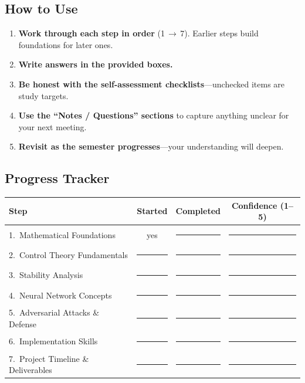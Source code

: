 \subsection*{How to Use}

\begin{enumerate}[leftmargin=2em]
	\item \textbf{Work through each step in order} (1\,$\to$\,7). Earlier steps build foundations for later ones.
	\item \textbf{Write answers in the provided boxes.}
	\item \textbf{Be honest with the self-assessment checklists}---unchecked items are study targets.
	\item \textbf{Use the ``Notes / Questions'' sections} to capture anything unclear for your next meeting.
	\item \textbf{Revisit as the semester progresses}---your understanding will deepen.
\end{enumerate}

\subsection*{Progress Tracker}

\begin{table}[h]
	\centering
	\renewcommand{\arraystretch}{1.4}
	\begin{tabularx}{\textwidth}{l c c c}
		\toprule
		\textbf{Step}                        & \textbf{Started}  & \textbf{Completed} & \textbf{Confidence (1--5)} \\
		\midrule
		1.\ Mathematical Foundations         & yes               & \rule{2cm}{0.4pt}  & \rule{1.5cm}{0.4pt}        \\
		2.\ Control Theory Fundamentals      & \rule{2cm}{0.4pt} & \rule{2cm}{0.4pt}  & \rule{1.5cm}{0.4pt}        \\
		3.\ Stability Analysis               & \rule{2cm}{0.4pt} & \rule{2cm}{0.4pt}  & \rule{1.5cm}{0.4pt}        \\
		4.\ Neural Network Concepts          & \rule{2cm}{0.4pt} & \rule{2cm}{0.4pt}  & \rule{1.5cm}{0.4pt}        \\
		5.\ Adversarial Attacks \& Defense   & \rule{2cm}{0.4pt} & \rule{2cm}{0.4pt}  & \rule{1.5cm}{0.4pt}        \\
		6.\ Implementation Skills            & \rule{2cm}{0.4pt} & \rule{2cm}{0.4pt}  & \rule{1.5cm}{0.4pt}        \\
		7.\ Project Timeline \& Deliverables & \rule{2cm}{0.4pt} & \rule{2cm}{0.4pt}  & \rule{1.5cm}{0.4pt}        \\
		\bottomrule
	\end{tabularx}
\end{table}

